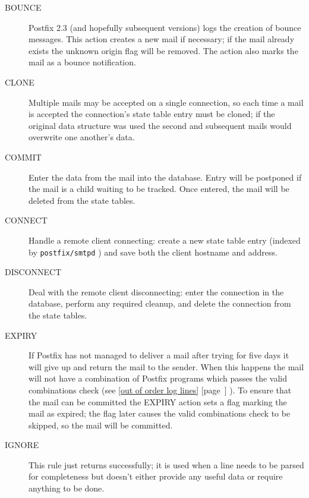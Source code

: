 \documentclass[a4paper,12pt,draft]{article}
\newcommand{\refwithpage}[1]{%
    \empty{}\ref{#1} [page~\pageref{#1}]%
}
\newcommand{\sectionref}[1]{%
    \textsection{}\refwithpage{#1}%
}
\newcommand{\daemon}[1]{%
    \texttt{postfix/#1}%
}
\begin{document}
\begin{description}

    \item [BOUNCE] Postfix 2.3 (and hopefully subsequent versions) logs the
        creation of bounce messages.  This action creates a new mail if
        necessary; if the mail already exists the unknown origin flag will
        be removed.  The action also marks the mail as a bounce
        notification.

    \item [CLONE] Multiple mails may be accepted on a single connection, so
        each time a mail is accepted the connection's state table entry
        must be cloned; if the original data structure was used the second
        and subsequent mails would overwrite one another's data.

    \item [COMMIT] Enter the data from the mail into the database. Entry
        will be postponed if the mail is a child waiting to be tracked.
        Once entered, the mail will be deleted from the state tables.

    \item [CONNECT] Handle a remote client connecting: create a new state
        table entry (indexed by \daemon{smtpd} \pid{}) and save both the
        client hostname and \IP{} address.

    \item [DISCONNECT] Deal with the remote client disconnecting: enter the
        connection in the database, perform any required cleanup, and
        delete the connection from the state tables.

    \item [EXPIRY] If Postfix has not managed to deliver a mail after
        trying for five days it will give up and return the mail to the
        sender.  When this happens the mail will not have a combination of
        Postfix programs which passes the valid combinations check (see
        \sectionref{out of order log lines}).  To ensure that the mail can
        be committed the EXPIRY action sets a flag marking the mail as
        expired; the flag later causes the valid combinations check to be
        skipped, so the mail will be committed.

    \item [IGNORE] This rule just returns successfully; it is used when a
        line needs to be parsed for completeness but doesn't either provide
        any useful data or require anything to be done.


\end{description}
\end{document}
